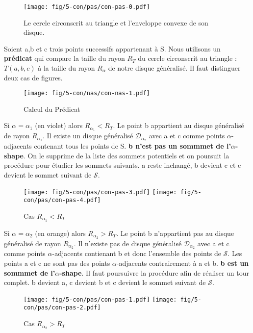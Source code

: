 \begin{figure}[H]
  \centering
  \texttt{[image: fig/5-con/pas/con-pas-0.pdf]}
  \caption{Le cercle circonscrit au triangle et l'enveloppe convexe de son disque.}
\end{figure}

Soient a,b et c trois points successifs appartenant à S. Nous utilisons un \textbf{prédicat} qui compare la taille du rayon \textbf{$R_T$} du cercle circonscrit au triangle : $T(a, b, c)$ à la taille du rayon $R_{\alpha}$ de notre disque généralisé. Il faut distinguer deux cas de figures.\\

\begin{figure}[H]
  \centering
  \texttt{[image: fig/5-con/nas/con-nas-1.pdf]}
  \caption{Calcul du Prédicat}
\end{figure}

Si $\alpha = \alpha_{1}$ (en violet) alors \textbf{$R_{\alpha_{1}} < R_T$}. Le point b appartient au disque généralisé de rayon $R_{\alpha_{1}}$. Il existe un disque généralisé $\mathcal{D}_{\alpha_2}$ avec a et c comme points $\alpha$-adjacents contenant tous les points de S. \textbf{b n'est pas un sommmet de l'$\alpha$-shape}. On le supprime de la liste des sommets potentiels et on poursuit la procédure pour étudier les sommets suivants. a reste inchangé, b devient c et c devient le sommet suivant de $\mathcal{S}$.

\begin{figure}[H]
  \centering
  \texttt{[image: fig/5-con/pas/con-pas-3.pdf]}
  \texttt{[image: fig/5-con/pas/con-pas-4.pdf]}
  \caption{Cas $R_{\alpha_{1}} < R_T$}
\end{figure}

Si $\alpha = \alpha_{2}$ (en orange) alors \textbf{$R_{\alpha_{2}} > R_T$}. Le point b n'appartient pas au disque généralisé de rayon $R_{\alpha_{2}}$. Il n'existe pas de disque généralisé $\mathcal{D}_{\alpha_2}$ avec a et c comme points $\alpha$-adjacents contienant b et donc l'ensemble des points de $\mathcal{S}$. Les points a et c ne sont pas des points $\alpha$-adjacents contrairement à a et b. \textbf{b est un sommmet de l'$\alpha$-shape}. Il faut poursuivre la procédure afin de réaliser un tour complet. b devient a, c devient b et c devient le sommet suivant de $\mathcal{S}$.\\

\begin{figure}[H]
  \centering
  \texttt{[image: fig/5-con/pas/con-pas-1.pdf]}
  \texttt{[image: fig/5-con/pas/con-pas-2.pdf]}
  \caption{Cas $R_{\alpha_{2}} > R_T$}
\end{figure}

